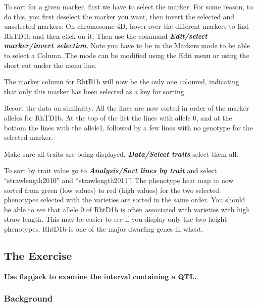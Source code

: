\documentclass[
]{book}
\begin{document}
To sort for a given marker, first we have to select the marker. For some reason, to do this, you first deselect the marker you want, then invert the selected and unselected markers: On chromosome 4D, hover over the different markers to find RhTD1b and then click on it. Then use the command \textbf{\emph{Edit/select marker/invert selection}}. Note you have to be in the Markers mode to be able to select a Column. The mode can be modified using the Edit menu or using the short cut under the menu line.

The marker column for RhtB1b will now be the only one coloured, indicating that only this marker has been selected as a key for sorting.

Resort the data on similarity. All the lines are now sorted in order of the marker alleles for RhTD1b. At the top of the list the lines with allele 0, and at the bottom the lines with the allele1, followed by a few lines with no genotype for the selected marker.

Make sure all traits are being displayed. \textbf{\emph{Data/Select traits}} select them all.

To sort by trait value go to \textbf{\emph{Analysis/Sort lines by trait}} and select ``strawlength2010'' and ``strawlength2011''. The phenotype heat map in now sorted from green (low values) to red (high values) for the two selected phenotypes selected with the varieties are sorted in the same order. You should be able to see that allele 0 of RhtD1b is often associated with varieties with high straw length. This may be easier to see if you display only the two height phenotypes. RhtD1b is one of the major dwarfing genes in wheat.

\hypertarget{the-exercise-3}{%
\subsection{The Exercise}\label{the-exercise-3}}

\textbf{Use flapjack to examine the interval containing a QTL.}

\hypertarget{background}{%
\subsubsection{Background}\label{background}}
\end{document}
